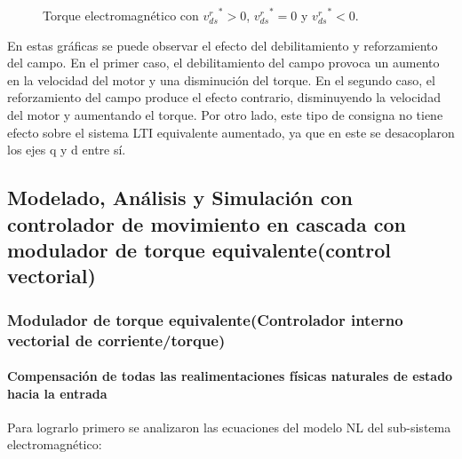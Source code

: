 \documentclass[a4paper, 10pt, onecolumn,journal]{ieeeconf}
\begin{document}
\begin{figure}[H]
	\centering
	\begin{adjustbox}{max width=\columnwidth}
	\end{adjustbox}
	\caption{Torque electromagnético con ${v^r_{ds}}^* > 0$, ${v^r_{ds}}^* = 0$ y ${v^r_{ds}}^* < 0$.}
	\label{Torque electromagnético con ${V^r_{ds}}^* > 0$, ${V^r_{ds}}^* = 0$ y ${V^r_{ds}}^* < 0$}
\end{figure}
En estas gráficas se puede observar el efecto del debilitamiento y reforzamiento del campo. En el primer caso, el debilitamiento del campo provoca un aumento en la velocidad del motor y una disminución del torque. En el segundo caso, el reforzamiento del campo produce el efecto contrario, disminuyendo la velocidad del motor y aumentando el torque. Por otro lado, este tipo de consigna no tiene efecto sobre el sistema LTI equivalente aumentado, ya que en este se desacoplaron los ejes q y d entre sí.

\subsection{\textbf{Modelado, Análisis y Simulación con controlador de movimiento en cascada con modulador de torque equivalente(control vectorial)}}
\label{subsec: Diseño del controlador}

\subsubsection{\textbf{Modulador de torque equivalente(Controlador interno vectorial de corriente/torque)}}
\paragraph{\textbf{Compensación de todas las realimentaciones físicas naturales de estado hacia la entrada}}
Para lograrlo primero se analizaron las ecuaciones del modelo NL del sub-sistema electromagnético:
\end{document}

